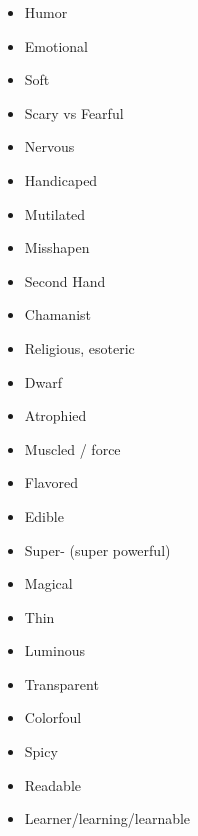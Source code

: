 \begin{itemize}
\item Humor
\item Emotional
\item Soft
\item Scary vs Fearful
\item Nervous
\item Handicaped
\item Mutilated
\item Misshapen
\item Second Hand
\item Chamanist
\item Religious, esoteric
\item Dwarf
\item Atrophied
\item Muscled / force
\item Flavored
\item Edible
\item Super- (super powerful)
\item Magical
\item Thin
\item Luminous
\item Transparent
\item Colorfoul
\item Spicy
\item Readable
\item Learner/learning/learnable
\end{itemize}
